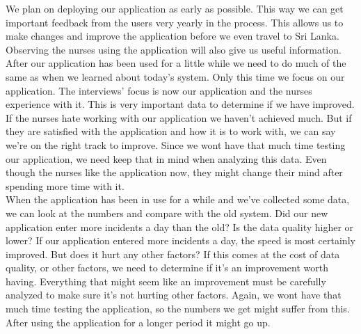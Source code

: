 \documentclass[UKenglish, 12pt]{article}
\begin{document}
We plan on deploying our application as early as possible. This way we can get
important feedback from the users very yearly in the process. This allows us to
make changes and improve the application before we even travel to Sri Lanka. 
Observing the nurses using the application will also give us useful information.\\

After our application has been used for a little while we need to do
much of the same as when we learned about today's system. Only this time we
focus on our application. The interviews' focus is now our application and the nurses
experience with it. This is very important data to determine if we have
improved. If the nurses hate working with our application we haven't achieved much.
But if they are satisfied with the application and how it is to work with, we can say
we're on the right track to improve. Since we wont have that much time
testing our application, we need keep that in mind when analyzing this data.
Even though the nurses like the application now, they might change their mind after
spending more time with it.\\

When the application has been in use for a while and we've collected some data,
we can look at the numbers and compare with the old system. Did our new application
enter more incidents a day than the old? Is the data quality higher or lower?
If our application entered more incidents a day, the speed is most certainly
improved. But does it hurt any other factors? If this comes at the cost 
of data quality, or other factors, we need to determine if it's an improvement 
worth having. Everything that might seem like an improvement must be carefully
analyzed to make sure it's not hurting other factors. Again, we wont have that
much time testing the application, so the numbers we get might suffer from this.
After using the application for a longer period it might go up.

\printbibliography
\end{document}
